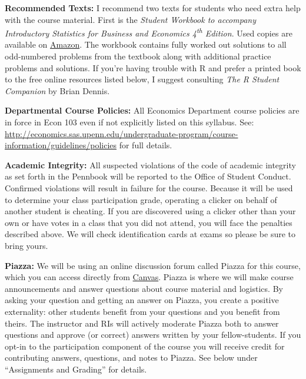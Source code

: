 \documentclass[11pt, letterpaper]{article}
\begin{document}
\medskip

\noindent \textbf{Recommended Texts:} 
I recommend two texts for students who need extra help with the course material. 
First is the \emph{Student Workbook to accompany Introductory Statistics for Business and Economics 4\textsuperscript{th} Edition}. 
Used copies are available on \href{http://www.amazon.com/gp/offer-listing/0471508993/sr=/qid=/ref=olp_page_2?ie=UTF8&colid=&coliid=&condition=all&me=&qid=&shipPromoFilter=0&sort=sip&sr=&startIndex=10}{Amazon}. 
The workbook contains fully worked out solutions to all odd-numbered problems from the textbook along with additional practice problems and solutions.
If you're having trouble with R and prefer a printed book to the free online resources listed below, I suggest consulting \emph{The R Student Companion} by Brian Dennis.


\newpage

\noindent \textbf{Departmental Course Policies: } 
All Economics Department course policies are in force in Econ 103 even if not explicitly listed on this syllabus. 
See: \url{http://economics.sas.upenn.edu/undergraduate-program/course-information/guidelines/policies} for full details. 


\bigskip


\noindent \textbf{Academic Integrity: } 
All suspected violations of the code of academic integrity as set forth in the Pennbook will be reported to the Office of Student Conduct. 
Confirmed violations will result in failure for the course. 
Because it will be used to determine your class participation grade, operating a clicker on behalf of another student is cheating. 
If you are discovered using a clicker other than your own or have votes in a class that you did not attend, you will face the penalties described above. 
We will check identification cards at exams so please be sure to bring yours.

\medskip

\noindent \textbf{Piazza:} 
We will be using an online discussion forum called Piazza for this course, which you can access directly from \href{http://upenn.instructure.com}{Canvas}. 
Piazza is where we will make course announcements and answer questions about course material and logistics.
By asking your question and getting an answer on Piazza, you create a positive externality: other students benefit from your questions and you benefit from theirs. 
The instructor and RIs will actively moderate Piazza both to answer questions and approve (or correct) answers written by your fellow-students.
If you opt-in to the participation component of the course you will receive credit for contributing answers, questions, and notes to Piazza. 
See below under ``Assignments and Grading'' for details.
\end{document}
